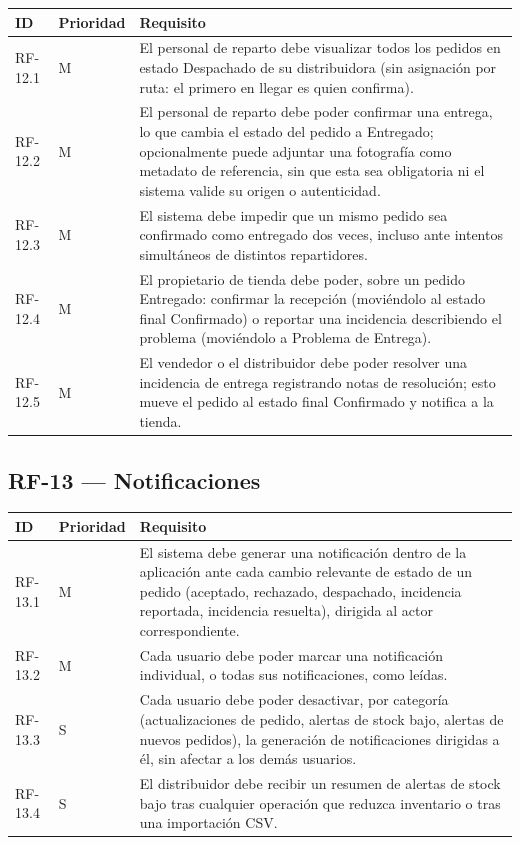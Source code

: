 \documentclass[12pt,a4paper]{report}
\begin{document}
\begin{longtable}{|p{2cm}|p{2cm}|p{10cm}|}
\hline
\textbf{ID} & \textbf{Prioridad} & \textbf{Requisito} \\ \hline
RF-12.1 & M & El personal de reparto debe visualizar todos los pedidos en estado Despachado de su distribuidora (sin asignación por ruta: el primero en llegar es quien confirma). \\ \hline
RF-12.2 & M & El personal de reparto debe poder confirmar una entrega, lo que cambia el estado del pedido a Entregado; opcionalmente puede adjuntar una fotografía como metadato de referencia, sin que esta sea obligatoria ni el sistema valide su origen o autenticidad. \\ \hline
RF-12.3 & M & El sistema debe impedir que un mismo pedido sea confirmado como entregado dos veces, incluso ante intentos simultáneos de distintos repartidores. \\ \hline
RF-12.4 & M & El propietario de tienda debe poder, sobre un pedido Entregado: confirmar la recepción (moviéndolo al estado final Confirmado) o reportar una incidencia describiendo el problema (moviéndolo a Problema de Entrega). \\ \hline
RF-12.5 & M & El vendedor o el distribuidor debe poder resolver una incidencia de entrega registrando notas de resolución; esto mueve el pedido al estado final Confirmado y notifica a la tienda. \\ \hline
\end{longtable}

\subsection{RF-13 --- Notificaciones}

\begin{longtable}{|p{2cm}|p{2cm}|p{10cm}|}
\hline
\textbf{ID} & \textbf{Prioridad} & \textbf{Requisito} \\ \hline
RF-13.1 & M & El sistema debe generar una notificación dentro de la aplicación ante cada cambio relevante de estado de un pedido (aceptado, rechazado, despachado, incidencia reportada, incidencia resuelta), dirigida al actor correspondiente. \\ \hline
RF-13.2 & M & Cada usuario debe poder marcar una notificación individual, o todas sus notificaciones, como leídas. \\ \hline
RF-13.3 & S & Cada usuario debe poder desactivar, por categoría (actualizaciones de pedido, alertas de stock bajo, alertas de nuevos pedidos), la generación de notificaciones dirigidas a él, sin afectar a los demás usuarios. \\ \hline
RF-13.4 & S & El distribuidor debe recibir un resumen de alertas de stock bajo tras cualquier operación que reduzca inventario o tras una importación CSV. \\ \hline
\end{longtable}
\end{document}
